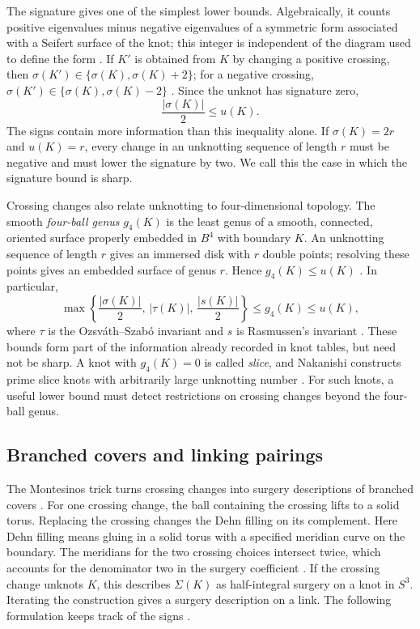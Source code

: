 \documentclass[12pt, oneside]{amsart}
\newcommand{\dbc}{\Sigma}
\begin{document}
The signature gives one of the simplest lower bounds. Algebraically, it counts positive
eigenvalues minus negative eigenvalues of a symmetric form associated with a Seifert surface of the knot;
this integer is independent of the diagram used to define the form
\cite[\S1, Thm.~3.1]{Murasugi}. If $K'$ is obtained from $K$ by changing a positive crossing, then
$\sigma(K')\in\{\sigma(K),\sigma(K)+2\}$; for a negative crossing,
$\sigma(K')\in\{\sigma(K),\sigma(K)-2\}$
\cite{Murasugi,CL}. Since the unknot has signature zero,
\begin{equation}\label{eq:signature-bound}
    \frac{|\sigma(K)|}{2}\le u(K).
\end{equation}
The signs contain more information than this inequality alone. If $\sigma(K)=2r$ and
$u(K)=r$, every change in an unknotting sequence of length $r$ must be negative and must
lower the signature by two. We call this the case in which the signature bound is sharp.

Crossing changes also relate unknotting to four-dimensional topology. The smooth
\emph{four-ball genus} $g_4(K)$ is the least genus of a smooth, connected, oriented surface
properly embedded in $B^4$ with boundary $K$. An unknotting sequence of length $r$ gives an
immersed disk with $r$ double points; resolving these points gives an embedded surface of
genus $r$. Hence $g_4(K)\le u(K)$ \cite{CL}. In particular,
\begin{equation}\label{eq:concordance}
    \max\left\{\frac{|\sigma(K)|}{2},\,|\tau(K)|,\,
                      \frac{|s(K)|}{2}\right\}\le g_4(K)\le u(K),
\end{equation}
where $\tau$ is the Ozsv\'ath--Szab\'o invariant and $s$ is Rasmussen's invariant
\cite{OStau,Rasmussen}. These bounds form part of the information already recorded in knot
tables, but need not be sharp. A knot with $g_4(K)=0$ is called
\emph{slice}, and Nakanishi constructs prime slice knots with arbitrarily large
unknotting number \cite[\S3.1]{Nakanishi81}. For such knots, a useful lower
bound must detect restrictions on crossing changes beyond the four-ball genus.

\subsection{Branched covers and linking pairings}

The Montesinos trick turns crossing changes into surgery descriptions of branched covers
\cite{Montesinos}. For one crossing change, the ball containing the crossing lifts to a
solid torus. Replacing the crossing changes the Dehn filling on its complement.
Here Dehn filling means gluing in a solid torus with a specified meridian curve on the
boundary. The meridians for the two crossing choices intersect twice, which accounts
for the denominator two in the surgery coefficient \cite[Lem.~3.2]{Owens}.
If the crossing change unknots $K$, this describes $\dbc(K)$ as half-integral surgery
on a knot in $S^3$. Iterating the construction gives a surgery description on a link. The following
formulation keeps track of the signs \cite[Thm.~3]{Owens}.
\end{document}
